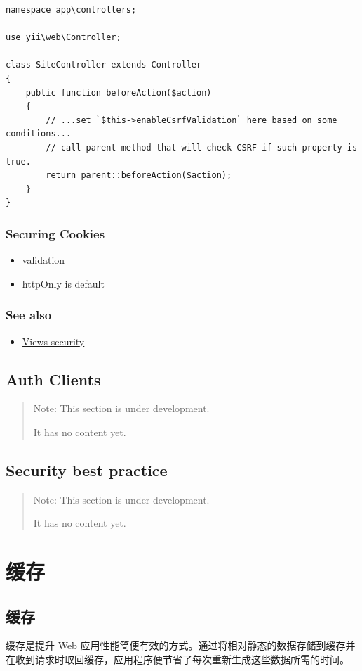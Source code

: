\lstset{language=php}\begin{lstlisting}
namespace app\controllers;

use yii\web\Controller;

class SiteController extends Controller
{
    public function beforeAction($action)
    {
        // ...set `$this->enableCsrfValidation` here based on some conditions...
        // call parent method that will check CSRF if such property is true.
        return parent::beforeAction($action);
    }
}
\end{lstlisting}
\subsection{Securing Cookies}
\begin{itemize}
\item validation
\item httpOnly is default
\end{itemize}
\subsection{See also}
\begin{itemize}
\item \hyperref[structure-views.md::security]{Views security}
\end{itemize}


\label{security-auth-clients.md}\section{Auth Clients}
\begin{quote}Note: This section is under development.

It has no content yet.

\end{quote}


\label{security-best-practices.md}\section{Security best practice}
\begin{quote}Note: This section is under development.

It has no content yet.

\end{quote}


\chapter{缓存}
\label{caching-overview.md}\section{缓存}
缓存是提升 Web 应用性能简便有效的方式。通过将相对静态的数据存储到缓存并在收到请求时取回缓存，应用程序便节省了每次重新生成这些数据所需的时间。

